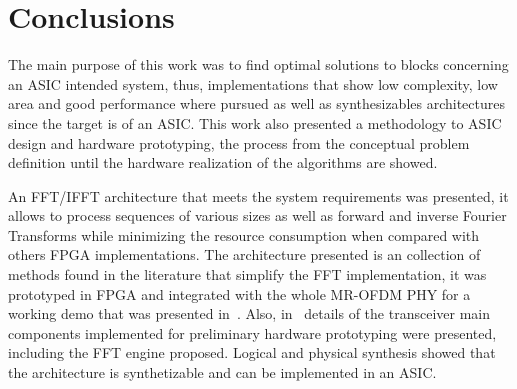 \chapter{Conclusions}


The main purpose of this work was to find optimal solutions to blocks concerning an ASIC intended system, thus, implementations that show low complexity, low area and good performance where pursued as well as synthesizables architectures since the target is of an ASIC. This work also presented a methodology to ASIC design and hardware prototyping, the process from the conceptual problem definition until the hardware realization of the algorithms are showed.

An FFT/IFFT architecture that meets the system requirements was presented, it allows to process sequences of various sizes as well as forward and inverse Fourier Transforms while minimizing the resource consumption when compared with others FPGA implementations. The architecture presented is an collection of methods found in the literature that simplify the FFT implementation, it was prototyped in FPGA and integrated with the whole MR-OFDM PHY for a working demo that was presented in~\cite{gcce2015}. Also, in~\cite{denise_iscas2016} details of the transceiver main components implemented for preliminary hardware prototyping were presented, including the FFT engine proposed. Logical and physical synthesis showed that the architecture is synthetizable and can be implemented in an ASIC. 





